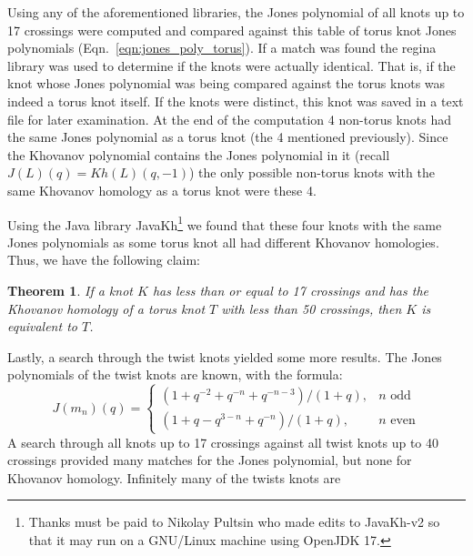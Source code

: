 \documentclass{article}
\theoremstyle{plain}
\newtheorem{theorem}{Theorem}
\begin{document}
        Using any of the aforementioned libraries, the Jones polynomial of all
        knots up to 17 crossings were computed and compared against this table
        of torus knot Jones polynomials (Eqn.~\ref{eqn:jones_poly_torus}).
        If a match was found the regina library was used to determine if the
        knots were actually identical. That is, if the knot whose Jones
        polynomial was being compared against the torus knots was indeed a
        torus knot itself. If the knots were distinct, this knot was saved in a
        text file for later examination. At the end of the computation 4
        non-torus knots had the same Jones polynomial as a torus knot
        (the 4 mentioned previously).
        Since the Khovanov polynomial contains the Jones polynomial in it
        (recall $J(L)(q)=Kh(L)(q,-1)$) the only possible non-torus knots with
        the same Khovanov homology as a torus knot were these 4.
        \par\hfill\par
        Using the Java library JavaKh\footnote{%
            Thanks must be paid to Nikolay Pultsin who made edits to
            JavaKh-v2 so that it may run on a GNU/Linux machine using
            OpenJDK 17.
        }
        we found that these four knots with the same Jones polynomials as some
        torus knot all had different Khovanov homologies. Thus, we have the
        following claim:
        \begin{theorem}
            If a knot $K$ has less than or equal to 17 crossings and has the
            Khovanov homology of a torus knot $T$ with less than 50 crossings,
            then $K$ is equivalent to $T$.
        \end{theorem}
        Lastly, a search through the twist knots yielded some more results.
        The Jones polynomials of the twist knots are known, with the formula:
        \begin{equation}
            J(m_{n})(q)=
            \begin{cases}
                (1+q^{-2}+q^{-n}+q^{-n-3})/(1+q),&n\textrm{ odd}\\
                (1+q-q^{3-n}+q^{-n})/(1+q),&n\textrm{ even}
            \end{cases}
        \end{equation}
        A search through all knots up to 17 crossings against all twist knots
        up to 40 crossings provided many matches for the Jones polynomial, but
        none for Khovanov homology. Infinitely many of the twists knots are
\end{document}
